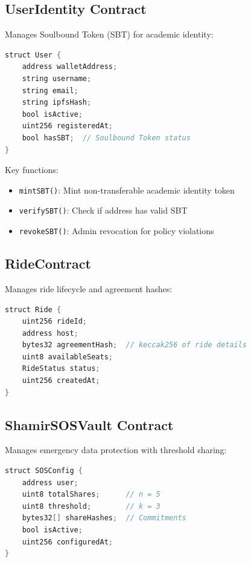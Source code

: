 \subsection{UserIdentity Contract}

Manages Soulbound Token (SBT) for academic identity:

\begin{lstlisting}[language=Java, caption=UserIdentity Contract Structure]
struct User {
    address walletAddress;
    string username;
    string email;
    string ipfsHash;
    bool isActive;
    uint256 registeredAt;
    bool hasSBT;  // Soulbound Token status
}
\end{lstlisting}

Key functions:
\begin{itemize}
    \item \texttt{mintSBT()}: Mint non-transferable academic identity token
    \item \texttt{verifySBT()}: Check if address has valid SBT
    \item \texttt{revokeSBT()}: Admin revocation for policy violations
\end{itemize}

\subsection{RideContract}

Manages ride lifecycle and agreement hashes:

\begin{lstlisting}[language=Java, caption=Ride Agreement Structure]
struct Ride {
    uint256 rideId;
    address host;
    bytes32 agreementHash;  // keccak256 of ride details
    uint8 availableSeats;
    RideStatus status;
    uint256 createdAt;
}
\end{lstlisting}

\subsection{ShamirSOSVault Contract}

Manages emergency data protection with threshold sharing:

\begin{lstlisting}[language=Java, caption=SOS Vault Structure]
struct SOSConfig {
    address user;
    uint8 totalShares;      // n = 5
    uint8 threshold;        // k = 3
    bytes32[] shareHashes;  // Commitments
    bool isActive;
    uint256 configuredAt;
}
\end{lstlisting}

